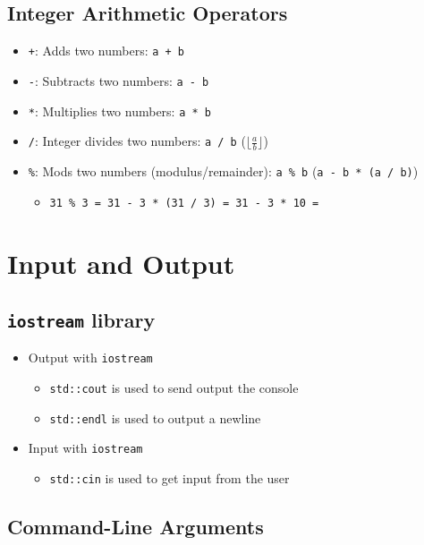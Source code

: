 \documentclass{article}
\begin{document}


\subsection{Integer Arithmetic Operators}
\begin{itemize}
	\item \texttt{+}: Adds two numbers: \texttt{a + b}
	\item \texttt{-}: Subtracts two numbers: \texttt{a - b}
	\item \texttt{*}: Multiplies two numbers: \texttt{a * b}
	\item \texttt{/}: Integer divides two numbers: \texttt{a / b} ($\lfloor\frac{a}{b}\rfloor$)
	\item \texttt{\%}: Mods two numbers (modulus/remainder): \texttt{a \% b} (\texttt{a - b * (a / b)}) \begin{itemize}
		\item \texttt{31 \% 3 = 31 - 3 * (31 / 3) = 31 - 3 * 10 = }
	\end{itemize}
\end{itemize}

\section{Input and Output}

\subsection{\texttt{iostream} library}

\begin{itemize}
	\item Output with \texttt{iostream}\begin{itemize}
		\item \texttt{std::cout} is used to send output the console
		\item \texttt{std::endl} is used to output a newline
	\end{itemize}
	\item Input with \texttt{iostream} \begin{itemize}
		\item \texttt{std::cin} is used to get input from the user
	\end{itemize}
	
\end{itemize}

\subsection{Command-Line Arguments}
\end{document}
